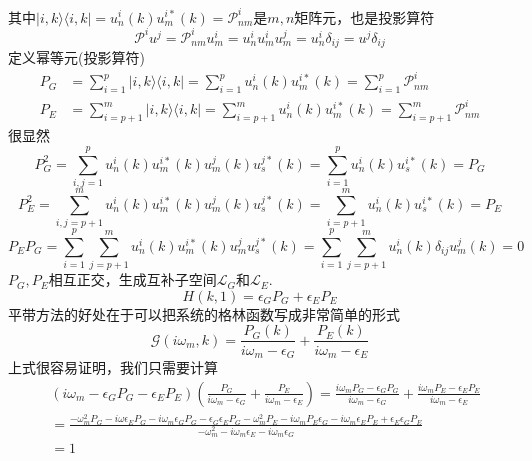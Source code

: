 \documentclass{article}
\numberwithin{equation}{subsection}
\begin{document}
其中$|i,k\rangle\langle i,k|=u_n^i(k)u_m^{i*}(k)=\mathcal{P}_{nm}^i$是$m,n$矩阵元，也是投影算符
\begin{equation}
    \mathcal{P}^iu^j=\mathcal{P}_{nm}^iu_m^i=u_n^iu_m^iu_m^j=u_n^i\delta_{ij}=u^j\delta_{ij}
\end{equation}
定义幂等元(投影算符)
\begin{equation}
    \begin{split}
        P_G&=\sum_{i=1}^{p}|i,k\rangle\langle i,k|=\sum_{i=1}^{p}u_n^i(k)u_m^{i*}(k)=\sum_{i=1}^{p}\mathcal{P}_{nm}^i\\
        P_E&=\sum_{i=p+1}^{m}|i,k\rangle\langle i,k|=\sum_{i=p+1}^{m}u_n^i(k)u_m^{i*}(k)=\sum_{i=p+1}^{m}\mathcal{P}_{nm}^i
    \end{split}
\end{equation}
很显然
\begin{equation}
    P_G^2=\sum_{i,j=1}^{p}u_n^i(k)u_m^{i*}(k)u_m^{j}(k)u_s^{j*}(k)=\sum_{i=1}^{p}u_n^i(k)u_s^{i*}(k)=P_G
\end{equation}
\begin{equation}
    P_E^2=\sum_{i,j=p+1}^{m}u_n^i(k)u_m^{i*}(k)u_m^{j}(k)u_s^{j*}(k)=\sum_{i=p+1}^{m}u_n^i(k)u_s^{i*}(k)=P_E
\end{equation}
\begin{equation}
    P_EP_G=\sum_{i=1}^{p}\sum_{j=p+1}^{m}u_n^i(k)u_m^{i*}(k)u_m^{j}u_s^{j*}(k)=\sum_{i=1}^{p}\sum_{j=p+1}^{m}u_n^i(k)\delta_{ij}u_m^j(k)=0
\end{equation}
$P_G,P_E$相互正交，生成互补子空间$\mathcal{L}_G$和$\mathcal{L}_E$. 
\begin{equation}
    H(k,1)=\epsilon_GP_G+\epsilon_EP_E
\end{equation}
平带方法的好处在于可以把系统的格林函数写成非常简单的形式
\begin{equation}
    \mathcal{G}(i\omega_m,k)=\frac{P_G(k)}{i\omega_m-\epsilon_G}+\frac{P_E(k)}{i\omega_m-\epsilon_E}
\end{equation}
上式很容易证明，我们只需要计算
\begin{equation}
    \begin{split}
        &(i\omega_m-\epsilon_GP_G-\epsilon_EP_E)(\frac{P_G}{i\omega_m-\epsilon_G}+\frac{P_E}{i\omega_m-\epsilon_E})=\frac{i\omega_mP_G-\epsilon_GP_G}{i\omega_m-\epsilon_G}+\frac{i\omega_mP_E-\epsilon_EP_E}{i\omega_m-\epsilon_E}\\
        &=\frac{-\omega_m^2P_G-i\omega\epsilon_EP_G-i\omega_m\epsilon_GP_G-\epsilon_G\epsilon_EP_G-\omega_m^2P_E-i\omega_mP_E\epsilon_G-i\omega_m\epsilon_EP_E+\epsilon_E\epsilon_GP_E}{-\omega_m^2-i\omega_m\epsilon_E-i\omega_m\epsilon_G}\\
        &=1
    \end{split}
\end{equation}
\end{document}
